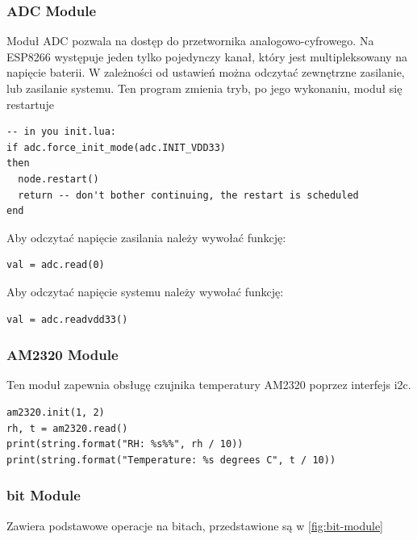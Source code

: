 \subsubsection{ADC Module}
Moduł ADC pozwala na dostęp do przetwornika analogowo-cyfrowego. Na ESP8266 występuje jeden tylko pojedynczy kanał, który jest multipleksowany na napięcie baterii. W zależności od ustawień można odczytać zewnętrzne zasilanie, lub zasilanie systemu. 
Ten program zmienia tryb, po jego wykonaniu, moduł się restartuje
\begin{lstlisting}
-- in you init.lua:
if adc.force_init_mode(adc.INIT_VDD33)
then
  node.restart()
  return -- don't bother continuing, the restart is scheduled
end
\end{lstlisting} 
Aby odczytać napięcie zasilania należy wywołać funkcję:
\begin{lstlisting}
val = adc.read(0)
\end{lstlisting} 
Aby odczytać napięcie systemu należy wywołać funkcję:
\begin{lstlisting}
val = adc.readvdd33()
\end{lstlisting} 

\subsubsection{AM2320 Module}
Ten moduł zapewnia obsługę czujnika temperatury AM2320 poprzez interfejs i2c.
\begin{lstlisting}
am2320.init(1, 2)
rh, t = am2320.read()
print(string.format("RH: %s%%", rh / 10))
print(string.format("Temperature: %s degrees C", t / 10))
\end{lstlisting} 


\subsubsection{bit Module}
Zawiera podstawowe operacje na bitach, przedstawione są w \autoref{fig:bit-module}

